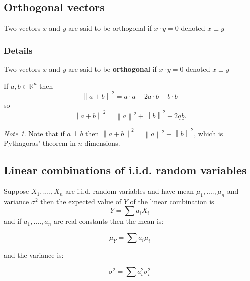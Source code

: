 \documentclass[12pt,a4paper]{article}
\theoremstyle{regla}
\theoremstyle{remark}
\newtheorem{notes}{Note}[section]
\theoremstyle{definition}
\theoremstyle{nonumberbreak}
\begin{document}
\subsection{Orthogonal vectors}
\begin{fbox}
\begin{minipage}{0.97\textwidth}
Two vectors $x$ and $y$ are said to be orthogonal if $x\cdot y=0$ denoted $x \perp y$
\end{minipage}
\end{fbox}
\subsubsection{Details}
\begin{defn}
Two vectors $x$ and $y$ are said to be {\bf orthogonal} if $x\cdot y=0$ denoted $x \perp y$
\end{defn}

If $a,b \in \mathbb{R}^n$ then 
$$\left\|a+b\right\|^2=a\cdot a+2a\cdot b+b\cdot b$$
so 
$$\left\|a+b\right\|^2=\left\|a\right\|^2+\left\|b\right\|^2 + 2\underline{a}\underline{b}.$$
\begin{notes}
Note that if $a \perp b$ then $\left\|a+b\right\|^2=\left\|a\right\|^2+ \left\|b\right\|^2$, which is Pythagoras' theorem in $n$ dimensions.
\end{notes}

\subsection{Linear combinations of i.i.d. random variables}
\begin{fbox}
\begin{minipage}{0.97\textwidth}
Suppose $X_1,....,X_n$ are i.i.d. random variables and have mean $\mu_1, ...., \mu_n$ and variance $\sigma^2$ 
then the expected value of $Y$ of the linear combination is 
$$Y=\sum a_i X_i$$
and if $a_1,....,a_n$ are real constants then the mean is:

$$\mu_Y = \sum a_i \mu_i$$

and the variance is:

$$\sigma^2 = \sum a^2_i \sigma^2_i$$
\end{minipage}
\end{fbox}
\end{document}
